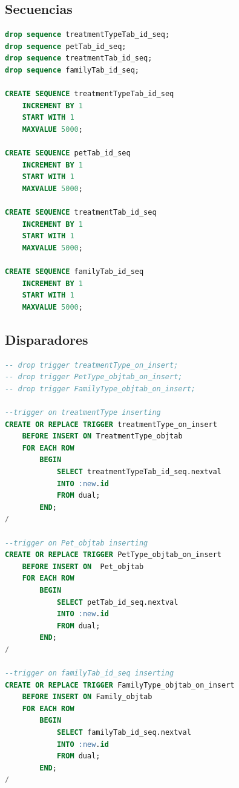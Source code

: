 \documentclass{FR16}
\begin{document}
\subsection{Secuencias}
\begin{lstlisting}[language=Sql, basicstyle=\scriptsize]
drop sequence treatmentTypeTab_id_seq;
drop sequence petTab_id_seq;
drop sequence treatmentTab_id_seq;
drop sequence familyTab_id_seq;

CREATE SEQUENCE treatmentTypeTab_id_seq
    INCREMENT BY 1
    START WITH 1
    MAXVALUE 5000;

CREATE SEQUENCE petTab_id_seq
    INCREMENT BY 1
    START WITH 1
    MAXVALUE 5000;

CREATE SEQUENCE treatmentTab_id_seq
    INCREMENT BY 1
    START WITH 1
    MAXVALUE 5000;

CREATE SEQUENCE familyTab_id_seq
    INCREMENT BY 1
    START WITH 1
    MAXVALUE 5000;
\end{lstlisting}
\newpage

\subsection{Disparadores}
\begin{lstlisting}[language=Sql, basicstyle=\scriptsize]
-- drop trigger treatmentType_on_insert;
-- drop trigger PetType_objtab_on_insert;
-- drop trigger FamilyType_objtab_on_insert;

--trigger on treatmentType inserting
CREATE OR REPLACE TRIGGER treatmentType_on_insert
    BEFORE INSERT ON TreatmentType_objtab
    FOR EACH ROW
        BEGIN 
            SELECT treatmentTypeTab_id_seq.nextval
            INTO :new.id
            FROM dual;
        END;
/

--trigger on Pet_objtab inserting
CREATE OR REPLACE TRIGGER PetType_objtab_on_insert
    BEFORE INSERT ON  Pet_objtab
    FOR EACH ROW
        BEGIN 
            SELECT petTab_id_seq.nextval
            INTO :new.id
            FROM dual;
        END;
/

--trigger on familyTab_id_seq inserting
CREATE OR REPLACE TRIGGER FamilyType_objtab_on_insert
    BEFORE INSERT ON Family_objtab
    FOR EACH ROW
        BEGIN 
            SELECT familyTab_id_seq.nextval
            INTO :new.id
            FROM dual;
        END;
/
\end{lstlisting}
\newpage
\end{document}
